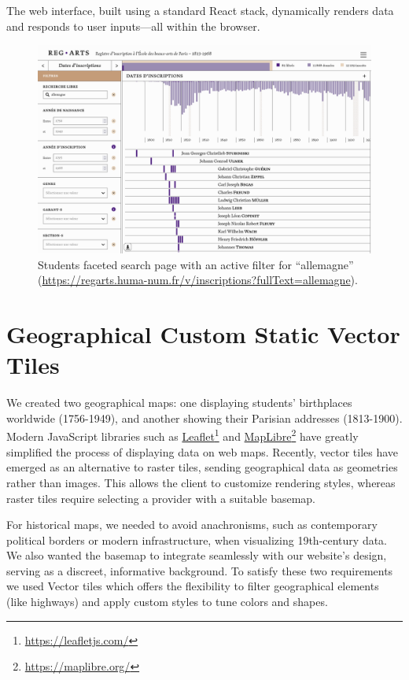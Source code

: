 \documentclass[final]{anthology-ch} %
\begin{document}
The web interface, built using a standard React stack, dynamically renders data and responds to user inputs—all within the browser.

\begin{figure}[t!]
  \centering
  \includegraphics[width=1\linewidth]{figures/faceted_search.png}
  \caption{Students faceted search page with an active filter for “allemagne” (\href{https://regarts.huma-num.fr/v/inscriptions?fullText=allemagne}{https://regarts.huma-num.fr/v/inscriptions?fullText=allemagne}).}
  \label{fig:faceted_search}
\end{figure}

\section{Geographical Custom Static Vector Tiles}
We created two geographical maps: one displaying students’ birthplaces worldwide (1756-1949), and another showing their Parisian addresses (1813-1900). Modern JavaScript libraries such as \href{https://leafletjs.com/}{Leaflet}\footnote{\url{https://leafletjs.com/}} and \href{https://maplibre.org/}{MapLibre}\footnote{\url{https://maplibre.org/}} have greatly simplified the process of displaying data on web maps. Recently, vector tiles have emerged as an alternative to raster tiles, sending geographical data as geometries rather than images. This allows the client to customize rendering styles, whereas raster tiles require selecting a provider with a suitable basemap.

For historical maps, we needed to avoid anachronisms, such as contemporary political borders or modern infrastructure, when visualizing 19th-century data. We also wanted the basemap to integrate seamlessly with our website’s design, serving as a discreet, informative background. To satisfy these two requirements we used Vector tiles which offers the flexibility to filter geographical elements (like highways) and apply custom styles to tune colors and shapes.
\end{document}
